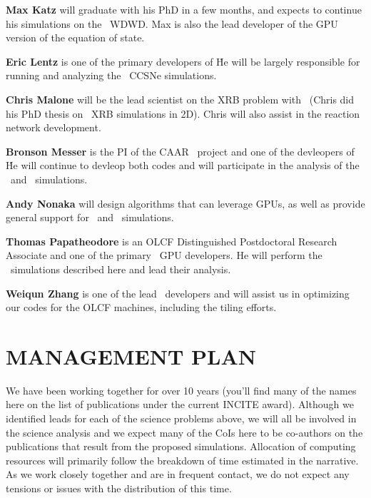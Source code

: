 \documentclass[11pt,letterpaper,english]{article}
\begin{document}
\begin{tightitem}
\item {\bf Max Katz} will graduate with his PhD in a few months, and
  expects to continue his simulations on the \castro\ WDWD.  Max is
  also the lead developer of the GPU version of the equation of state.

\item {\bf Eric Lentz} is one of the primary developers of \chimera\. He will 
be largely responsible for running and analyzing the \chimera\ CCSNe simulations. 

\item {\bf Chris Malone} will be the lead scientist on the XRB problem
  with \maestro\ (Chris did his PhD thesis on \maestro\ XRB simulations
  in 2D).  Chris will also assist in the reaction network development.

\item {\bf Bronson Messer} is the PI of the CAAR \flash\ project and one
of the devleopers of \chimera\. He will continue to devleop both codes and
will participate in the analysis of the \flash\ and \chimera\ simulations. 

\item {\bf Andy Nonaka} will design algorithms that can leverage GPUs,
  as well as provide general support for \maestro\ and \castro\ simulations.

\item {\bf Thomas Papatheodore} is an OLCF Distinguished Postdoctoral Research Associate 
and one of the primary \flash\ GPU developers. He will perform the \flash\ simulations 
described here and lead their analysis.   

\item {\bf Weiqun Zhang} is one of the lead \boxlib\ developers and will
  assist us in optimizing our codes for the OLCF machines, including the
  tiling efforts.

\end{tightitem} 

\section{MANAGEMENT PLAN}

We have been working together for over 10 years (you'll find many of
the names here on the list of publications under the current INCITE
award).  Although we identified leads for each of the science problems
above, we will all be involved in the science analysis and we expect
many of the CoIs here to be co-authors on the publications that result
from the proposed simulations.  Allocation of computing resources will
primarily follow the breakdown of time estimated in the narrative.  As
we work closely together and are in frequent contact, we do not expect
any tensions or issues with the distribution of this time.
\end{document}
